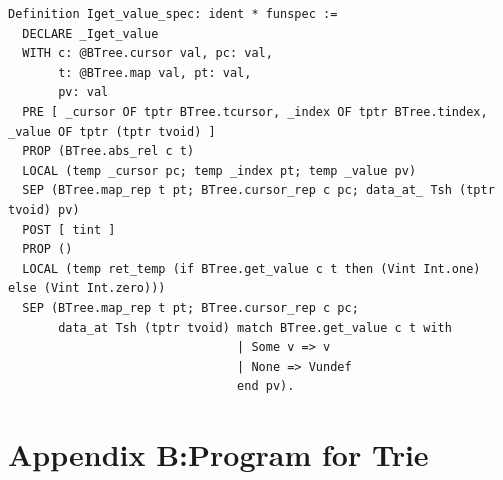 \documentclass[runningheads]{llncs}
\begin{document}
\begin{verbatim}
Definition Iget_value_spec: ident * funspec :=
  DECLARE _Iget_value
  WITH c: @BTree.cursor val, pc: val,
       t: @BTree.map val, pt: val,
       pv: val
  PRE [ _cursor OF tptr BTree.tcursor, _index OF tptr BTree.tindex, _value OF tptr (tptr tvoid) ]
  PROP (BTree.abs_rel c t)
  LOCAL (temp _cursor pc; temp _index pt; temp _value pv)
  SEP (BTree.map_rep t pt; BTree.cursor_rep c pc; data_at_ Tsh (tptr tvoid) pv)
  POST [ tint ]
  PROP ()
  LOCAL (temp ret_temp (if BTree.get_value c t then (Vint Int.one) else (Vint Int.zero)))
  SEP (BTree.map_rep t pt; BTree.cursor_rep c pc;
       data_at Tsh (tptr tvoid) match BTree.get_value c t with
                                | Some v => v
                                | None => Vundef
                                end pv).
\end{verbatim}

\section*{Appendix B:\@Functional Program for Trie}
\end{document}
